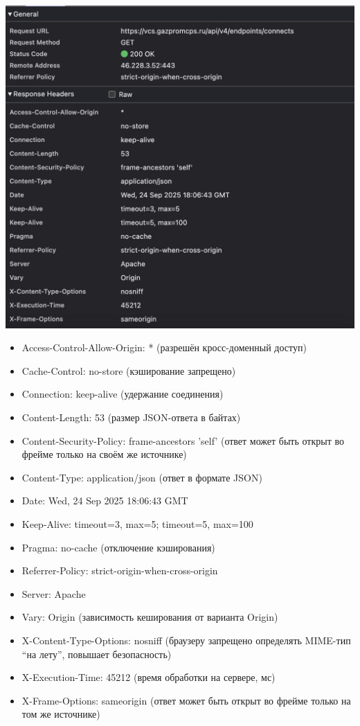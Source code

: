 \documentclass{article}
\begin{document}
\begin{center}
  \includegraphics[width=.9\textwidth]{10}
\end{center}

\begin{itemize}
  \item Access-Control-Allow-Origin: * (разрешён кросс-доменный доступ)
  \item Cache-Control: no-store (кэширование запрещено)
  \item Connection: keep-alive (удержание соединения)
  \item Content-Length: 53 (размер JSON-ответа в байтах)
  \item Content-Security-Policy: frame-ancestors 'self' (ответ может быть открыт во фрейме только на своём же источнике)
  \item Content-Type: application/json (ответ в формате JSON)
  \item Date: Wed, 24 Sep 2025 18:06:43 GMT
  \item Keep-Alive: timeout=3, max=5; timeout=5, max=100
  \item Pragma: no-cache (отключение кэширования)
  \item Referrer-Policy: strict-origin-when-cross-origin
  \item Server: Apache
  \item Vary: Origin (зависимость кеширования от варианта Origin)
  \item X-Content-Type-Options: nosniff (браузеру запрещено определять MIME-тип “на лету”, повышает безопасность)
  \item X-Execution-Time: 45212 (время обработки на сервере, мс)
  \item X-Frame-Options: sameorigin (ответ может быть открыт во фрейме только на том же источнике)
\end{itemize}
\end{document}
